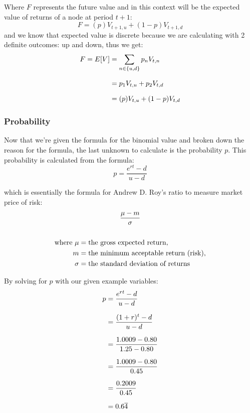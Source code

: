 \documentclass[12pt, letterpaper]{article}\usepackage{float}
\begin{document}
\noindent Where ${F}$ represents the future value and in this context will be the expected value of returns of a node at period ${t+1}$:
\begin{equation*}
  F = (p)V_{t+1,u} + (1-p)V_{t+1,d}
\end{equation*}
and we know that expected value is discrete because we are calculating with 2 definite outcomes: up and down, thus we get\cite{hussainteaching}:
\begin{equation*}
  \setlength{\jot}{10pt}
  \begin{split}
    F = E[V] 
    & = \sum\limits_{n \in \{u,d\}} p_n V_{t,n} \\
    & = p_1 V_{t,u} + p_2 V_{t,d} \\
    & = (p) V_{t,u} + (1-p) V_{t,d} \\
  \end{split}
\end{equation*}

\subsubsection*{Probability}
Now that we're given the formula for the binomial value and broken down the reason for the formula, the last unknown to calculate is the probability ${p}$. This probability is calculated from the formula:
\begin{equation*}
  p = \frac{e^{rt} - d}{u - d}
\end{equation*}

\noindent which is essentially the formula for Andrew D. Roy's ratio \cite{riskneutralmeasurewikipedia, sharperatiowikipedia, royssafetyfirstcriterionwikipedia} to measure market price of risk:
\begin{gather*}
  \setlength{\jot}{10pt}
  \frac{\mu - m}{\sigma} \\
  \\
  \begin{align*}
  \text{where}~\mu &= \text{the gross expected return}, \\
  m &= \text{the minimum acceptable return (risk)}, \\
  \sigma &= \text{the standard deviation of returns}
  \end{align*} \\
\end{gather*}

\pagebreak
By solving for ${p}$ with our given example variables:
\begin{equation*}
  \setlength{\jot}{10pt}
  \begin{split}
    p
    & = \frac{e^{rt} - d}{u - d} \\
    & = \frac{(1+r)^t - d}{u - d} \\
    & = \frac{1.0009 - 0.80}{1.25 - 0.80} \\
    & = \frac{1.0009 - 0.80}{0.45} \\
    & = \frac{0.2009}{0.45} \\
    & = 0.6\overline{4}
  \end{split}
\end{equation*}
\end{document}
